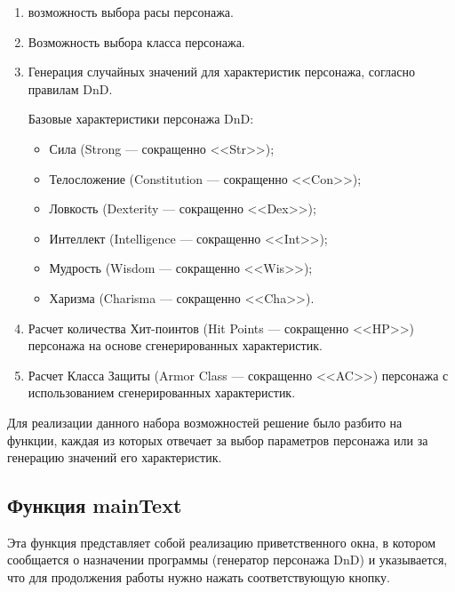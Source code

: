 \documentclass{altsu-report}
\begin{document}
\begin{enumerate}
    \item возможность выбора расы персонажа.
    
    \item Возможность выбора класса персонажа.
    
    \item Генерация случайных значений для характеристик персонажа, согласно правилам DnD.
    
    Базовые характеристики персонажа DnD:
    
    \begin{itemize}
        \item Сила (Strong --- сокращенно <<Str>>);
        
        \item Телосложение (Constitution --- сокращенно <<Con>>);
        
        \item Ловкость (Dexterity --- сокращенно <<Dex>>);
        
        \item Интеллект (Intelligence --- сокращенно <<Int>>);
        
        \item Мудрость (Wisdom --- сокращенно <<Wis>>);
        
        \item Харизма (Charisma --- сокращенно <<Cha>>).
    \end{itemize}
    
    \item Расчет количества Хит-поинтов (Hit Points --- сокращенно <<HP>>) персонажа на основе сгенерированных характеристик.
    
    \item Расчет Класса Защиты (Armor Class --- сокращенно <<AC>>) персонажа с использованием сгенерированных характеристик.
\end{enumerate}

Для реализации данного набора возможностей решение было разбито на функции, каждая из которых отвечает за выбор параметров персонажа или за генерацию значений его характеристик.

\subsection{Функция mainText}

Эта функция представляет собой реализацию приветственного окна, в котором сообщается о назначении программы (генератор персонажа DnD) и указывается, что для продолжения работы нужно нажать соответствующую кнопку.
\end{document}
